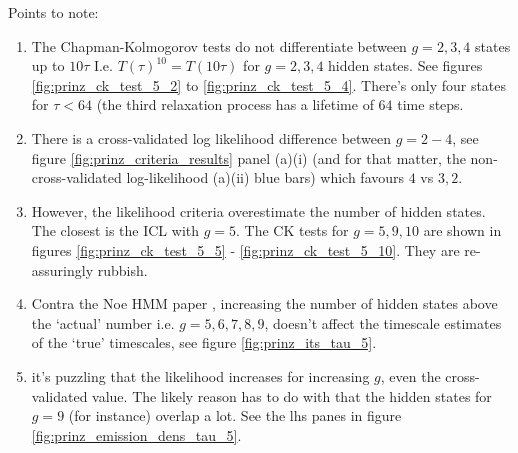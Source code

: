 Points to note: 
\begin{enumerate}
    \item The Chapman-Kolmogorov tests do not differentiate between $g = 2, 3, 4$ states up to $10\tau$ I.e. $T(\tau)^10 = T(10\tau)$ for $g = 2, 3, 4$ hidden states. See figures \ref{fig:prinz_ck_test_5_2} to \ref{fig:prinz_ck_test_5_4}. There's only four states for $\tau < 64$ (the third relaxation process has a lifetime of $64$ time steps. 
    \item There is a cross-validated log likelihood difference between $g = 2 - 4$, see figure \ref{fig:prinz_criteria_results} panel (a)(i) (and for that matter, the non-cross-validated log-likelihood (a)(ii) blue bars) which favours $4$ vs $3,2$. 
    \item However, the likelihood criteria overestimate the number of hidden states. The closest is the ICL with $g=5$. The CK tests for $g=5, 9, 10$ are shown in figures \ref{fig:prinz_ck_test_5_5} - \ref{fig:prinz_ck_test_5_10}. They are re-assuringly rubbish. 
    \item Contra the Noe HMM paper \cite{noeProjectedHiddenMarkov2013a}, increasing the number of hidden states above the `actual' number i.e. $g = 5, 6, 7, 8, 9$, doesn't affect the timescale estimates of the `true' timescales, see figure \ref{fig:prinz_its_tau_5}.
    \item it's puzzling that the likelihood increases for increasing $g$, even the cross-validated value. The likely reason has to do with that the hidden states for $g = 9$ (for instance) overlap a lot. See the lhs panes in figure \ref{fig:prinz_emission_dens_tau_5}.  
\end{enumerate}


